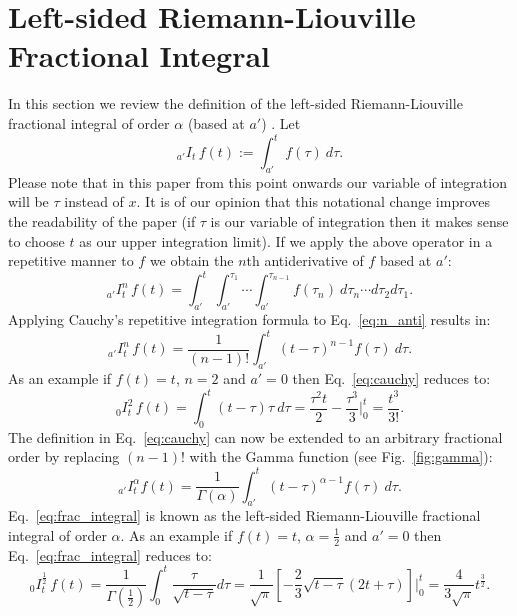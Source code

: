 \documentclass[twoside,reqno,11pt]{fcaa-var} %
\begin{document}
\section{Left-sided Riemann-Liouville Fractional Integral}
In this section we review the definition of the left-sided Riemann-Liouville fractional integral of order $\alpha$ (based at $a'$) \cite{laurent1884}. Let
\begin{equation}
_{a'}I_t\, f(t) := \int_{a'}^t f(\tau)~d\tau.
\end{equation}
Please note that in this paper from this point onwards our variable of integration will be $\tau$ instead of $x$. It is of our opinion that this notational change improves the readability of the paper (if $\tau$ is our variable of integration then it makes sense to choose $t$ as our upper integration limit). 
If we apply the above operator in a repetitive manner to $f$ we obtain the $n$th antiderivative of $f$ based at $a'$:
\begin{equation}
\label{eq:n_anti}
_{a'}I_t^n\,f(t) = \int_{a'}^t\int_{a'}^{\tau_1}\cdots \int_{a'}^{\tau_{n-1}}f(\tau_n)~d\tau_n\cdots d\tau_2 d\tau_1.
\end{equation}
Applying Cauchy's repetitive integration formula to Eq.~\eqref{eq:n_anti} results in:
\begin{equation}
\label{eq:cauchy}
_{a'}I_t^n\,f(t) = \frac{1}{(n-1)!}\int_{a'}^t (t-\tau)^{n-1}f(\tau)~d\tau.
\end{equation}
As an example if $f(t)=t$, $n=2$ and $a'=0$ then Eq.~\eqref{eq:cauchy} reduces to:
\begin{equation}
_{0}I_t^2\,f(t) = \int_0^t (t-\tau)\tau~d\tau = \frac{\tau^2 t}{2} - \frac{\tau^3}{3} \Bigg |_0^t = \frac{t^3}{3!}.
\end{equation}
The definition in Eq.~\eqref{eq:cauchy} can now be extended to an arbitrary fractional order by replacing $(n-1)!$ with the Gamma function (see Fig.~\ref{fig:gamma}):
\begin{equation}
\label{eq:frac_integral}
_{a'}I_t^{\alpha}f(t) = \frac{1}{\Gamma(\alpha)}\int_{a'}^t (t-\tau)^{\alpha-1}f(\tau)~d\tau.
\end{equation}
Eq.~\eqref{eq:frac_integral} is known as the left-sided Riemann-Liouville fractional integral of order $\alpha$. As an example if $f(t)=t$, $\alpha=\frac{1}{2}$ and $a'=0$ then 
Eq.~\eqref{eq:frac_integral} reduces to:
\begin{equation}
_0 I_t^{\frac{1}{2}}\,f(t) = \frac{1}{\Gamma(\frac{1}{2})} \int_0^t \frac{\tau}{\sqrt{t-\tau}} d\tau = \frac{1}{\sqrt{\pi}}\left [ -\frac{2}{3}\sqrt{t-\tau}(2t+\tau)\right] \Bigg |_0^t=\frac{4}{3\sqrt{\pi}}t^{\frac{3}{2}}. 
\end{equation}
\end{document}
